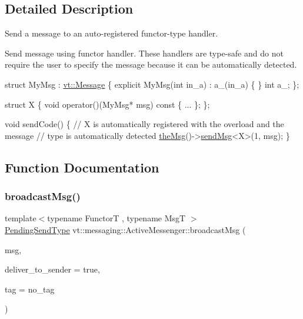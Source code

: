 \subsection{Detailed Description}
Send a message to an auto-\/registered functor-\/type handler. 

Send message using functor handler. These handlers are type-\/safe and do not require the user to specify the message because it can be automatically detected.


\begin{DoxyCode}
\textcolor{keyword}{struct }MyMsg : \hyperlink{structvt_1_1messaging_1_1_active_msg}{vt::Message} \{
  \textcolor{keyword}{explicit} MyMsg(\textcolor{keywordtype}{int} in\_a) : a\_(in\_a) \{ \}
  \textcolor{keywordtype}{int} a\_;
\};

\textcolor{keyword}{struct }X \{
  \textcolor{keywordtype}{void} operator()(MyMsg* msg)\textcolor{keyword}{ const }\{ ... \};
\};

\textcolor{keywordtype}{void} sendCode() \{
  \textcolor{comment}{// X is automatically registered with the overload and the message}
  \textcolor{comment}{// type is automatically detected}
  \hyperlink{namespacevt_aeafd31f866aeb4dc6fc2f6ee97136350}{theMsg}()->\hyperlink{group__preregister_ga0162a39473e7f9b490a79a7983d949ac}{sendMsg}<X>(1, msg);
\}
\end{DoxyCode}
 

\subsection{Function Documentation}
\mbox{\label{group__functorsend_ga880e93f0c239c1aa9c9ade805d75dd7a}} 
\subsubsection{\texorpdfstring{broadcast\+Msg()}{broadcastMsg()}\hspace{0.1cm}{\footnotesize\ttfamily [1/2]}}
{\footnotesize\ttfamily template$<$typename FunctorT , typename MsgT $>$ \\
\hyperlink{structvt_1_1messaging_1_1_active_messenger_a3626a6ca76d8ad4ec7c3b47a2c70d3a8}{Pending\+Send\+Type} vt\+::messaging\+::\+Active\+Messenger\+::broadcast\+Msg (\begin{DoxyParamCaption}\item[{\hyperlink{structvt_1_1messaging_1_1_msg_ptr_thief}{Msg\+Ptr\+Thief}$<$ MsgT $>$}]{msg,  }\item[{bool}]{deliver\+\_\+to\+\_\+sender = {\ttfamily true},  }\item[{\hyperlink{namespacevt_a84ab281dae04a52a4b243d6bf62d0e52}{Tag\+Type}}]{tag = {\ttfamily no\+\_\+tag} }\end{DoxyParamCaption})}



